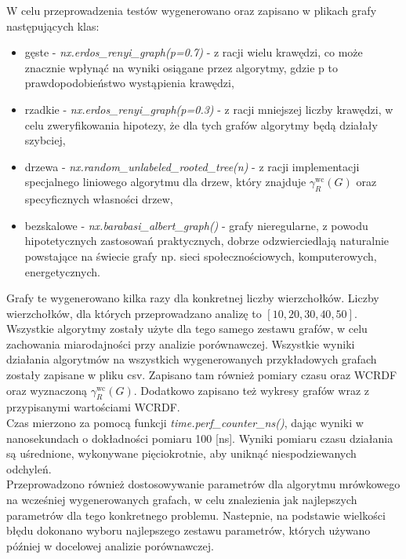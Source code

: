 W celu przeprowadzenia testów wygenerowano oraz zapisano w plikach grafy następujących klas: 
\begin{itemize}
    \item gęste - \textit{nx.erdos\_renyi\_graph(p=0.7)} - z racji wielu krawędzi, co może znacznie wpłynąć na wyniki osiągane przez algorytmy, gdzie p to prawdopodobieństwo wystąpienia krawędzi,
    \item rzadkie - \textit{nx.erdos\_renyi\_graph(p=0.3)} - z racji mniejszej liczby krawędzi, w celu zweryfikowania hipotezy, że dla tych grafów algorytmy będą działały szybciej,
    \item drzewa - \textit{nx.random\_unlabeled\_rooted\_tree(n)} - z racji implementacji specjalnego liniowego algorytmu dla drzew, który znajduje $\gamma_{R}^{\text{wc}}(G)$ oraz specyficznych własności drzew,
    \item bezskalowe - \textit{nx.barabasi\_albert\_graph()} - grafy nieregularne, z powodu hipotetycznych zastosowań praktycznych, dobrze odzwierciedlają naturalnie powstające na świecie grafy np. sieci społecznościowych, komputerowych, energetycznych.
\end{itemize}

Grafy te wygenerowano kilka razy dla konkretnej liczby wierzchołków. Liczby wierzchołków, dla których przeprowadzano analizę to $[10, 20, 30, 40, 50]$. Wszystkie algorytmy zostały użyte dla tego samego zestawu grafów, w celu zachowania miarodajności przy analizie porównawczej. Wszystkie wyniki działania algorytmów na wszystkich wygenerowanych przykładowych grafach zostały zapisane w pliku csv. Zapisano tam również pomiary czasu oraz WCRDF oraz wyznaczoną $\gamma_{R}^{\text{wc}}(G)$. Dodatkowo zapisano też wykresy grafów wraz z przypisanymi wartościami WCRDF.\\

Czas mierzono za pomocą funkcji \textit{time.perf\_counter\_ns()}, dając wyniki w nanosekundach o dokładności pomiaru 100 [ns]. Wyniki pomiaru czasu działania są uśrednione, wykonywane pięciokrotnie, aby uniknąć niespodziewanych odchyleń.\\

Przeprowadzono również dostosowywanie parametrów dla algorytmu mrówkowego na wcześniej wygenerowanych grafach, w celu znalezienia jak najlepszych parametrów dla tego konkretnego problemu. Nastepnie, na podstawie wielkości błędu dokonano wyboru najlepszego zestawu parametrów, których używano później w docelowej analizie porównawczej.\\


